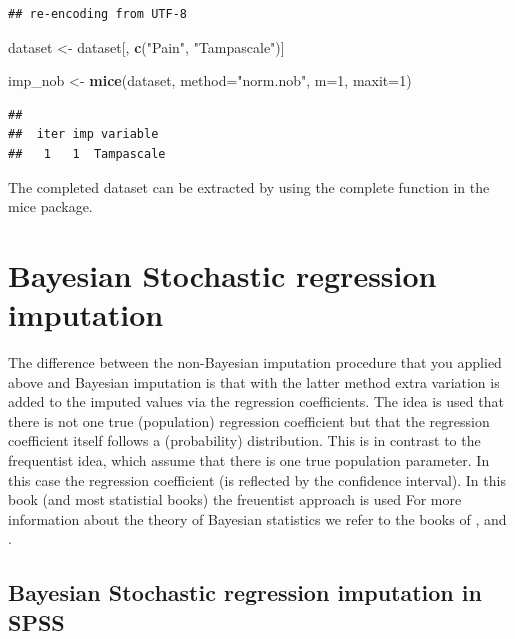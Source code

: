 \documentclass[]{book}
\newenvironment{Shaded}{\begin{snugshade}}{\end{snugshade}}
\newcommand{\KeywordTok}[1]{\textcolor[rgb]{0.13,0.29,0.53}{\textbf{#1}}}
\newcommand{\DataTypeTok}[1]{\textcolor[rgb]{0.13,0.29,0.53}{#1}}
\newcommand{\DecValTok}[1]{\textcolor[rgb]{0.00,0.00,0.81}{#1}}
\newcommand{\StringTok}[1]{\textcolor[rgb]{0.31,0.60,0.02}{#1}}
\newcommand{\NormalTok}[1]{#1}
\begin{document}
\begin{verbatim}
## re-encoding from UTF-8
\end{verbatim}

\begin{Shaded}
\begin{Highlighting}[]
\NormalTok{dataset <-}\StringTok{ }\NormalTok{dataset[, }\KeywordTok{c}\NormalTok{(}\StringTok{"Pain"}\NormalTok{, }\StringTok{"Tampascale"}\NormalTok{)]}

\NormalTok{imp_nob <-}\StringTok{ }\KeywordTok{mice}\NormalTok{(dataset, }\DataTypeTok{method=}\StringTok{"norm.nob"}\NormalTok{, }\DataTypeTok{m=}\DecValTok{1}\NormalTok{, }\DataTypeTok{maxit=}\DecValTok{1}\NormalTok{)}
\end{Highlighting}
\end{Shaded}

\begin{verbatim}
## 
##  iter imp variable
##   1   1  Tampascale
\end{verbatim}

The completed dataset can be extracted by using the complete function in
the mice package.

\section{Bayesian Stochastic regression
imputation}\label{bayesian-stochastic-regression-imputation}

The difference between the non-Bayesian imputation procedure that you
applied above and Bayesian imputation is that with the latter method
extra variation is added to the imputed values via the regression
coefficients. The idea is used that there is not one true (population)
regression coefficient but that the regression coefficient itself
follows a (probability) distribution. This is in contrast to the
frequentist idea, which assume that there is one true population
parameter. In this case the regression coefficient (is reflected by the
confidence interval). In this book (and most statistial books) the
freuentist approach is used For more information about the theory of
Bayesian statistics we refer to the books of
\citet{box2007bayesianinferencein}, \citet{enders2010applied} and
\citet{gelman2014bayesian}.

\subsection{Bayesian Stochastic regression imputation in
SPSS}\label{bayesian-stochastic-regression-imputation-in-spss}
\end{document}
